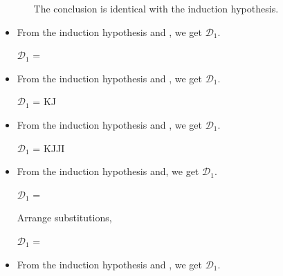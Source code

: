 \begin{itemize}
\begin{itemize}
	      	      The conclusion is identical with the induction hypothesis.
	      	      	      	      	      	      
	      \end{itemize}
	      	      	      
	\item \QKRefl
	      	      	      
	      From the induction hypothesis and \QKRefl, we get $\mathcal{D}_1$.
	      	      	      
	      $\mathcal{D}_1$ = 
	      {}
	      	      	      
	\item \QKSym
	      	      	      
	      From the induction hypothesis and \QKSym, we get $\mathcal{D}_1$.
	      	      	      
	      $\mathcal{D}_1$ = 
	      {\GGV K\SB\E J\SB@A\SB}
	      	      	      
	\item \QKTrans
	      	      	      
	      From the induction hypothesis and \QKTrans, we get $\mathcal{D}_1$.
	      	      	      
	      $\mathcal{D}_1$ = 
	      {\GGV K\SB\E J\SB@A\SB \andalso \GGV J\SB\E I\SB@A\SB}
	      	      	      
	\item \QTAbs
	      	      	      
	      From the induction hypothesis and, we get $\mathcal{D}_1$.
	      	      	      
	      $\mathcal{D}_1$ = 
	      { \andalso {}}
	      	      	      
	      Arrange substitutions,
	      	      	      
	      $\mathcal{D}_1$ = 
	      { \andalso {}}
	      	      	      
	\item \QTApp
	      	      	      
	      From the induction hypothesis and \QTApp, we get $\mathcal{D}_1$.
	      	      	      

\end{itemize}
